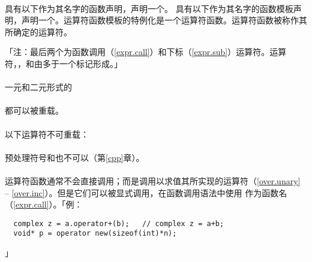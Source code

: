 \paragraph{}
具有以下作为其名字的函数声明，声明一个。
具有以下作为其名字的函数模板声明，声明一个。运算符函数模板的特例化是一个运算符函数。运算符函数被称作其
所确定的运算符。

 { %
  \newcommand{\cir}{\textasciicircum}
  \newcommand{\til}{\textasciitilde}
  \newcommand{\ttl}{\textless}
  \newcommand{\ttg}{\textgreater}
  \synprd{\tm{+ \ \ \ - \ \ \ \ \ * \ \ \ \ / \ \ \ \ \ \ \ \% \ \ \ \ \cir \ \
              \ \ \ \& \ \ \ \ | \ \ \ \ \til}}
  \synprd{\tm{! \ \ = \ \ \ \ \ < \ \ \ \ > \ \ \ \ \ \ \ += \ \ \ -= \ \ \ *= \
              \ \ /= \ \ \ \%=}}
  \synprd{\tm{\cir= \ \ \&= \ \ \ \ |= \ \ \ \ttl{}\ttl \ \ \ \ \ \ \ \ttg{}\ttg
              \ \ \ \ \ttg{}\ttg= \ \ \ttl{}\ttl= \ \ == \ \ \ !=}}
  \synprd{\tm{\ttl= \ \ \ttg= \ \ \ \ \&\& \ \ \ || \ \ \ \ \ \ ++ \ \ \ -- \ \
              \ \ , \ \ \ \ ->* \ \ ->}}
  \synprd[]{\tm{() \ \ []}}
} %

「注：最后两个为函数调用（\ref{expr.call}）和下标（\ref{expr.sub}）运算符。运算
符\tm{new[]}，，\tm{()}和\tm{[]}由多于一个标记形成。」

\paragraph{}
一元和二元形式的                                                              \\
\mbox{\qquad{\tm{+\qquad{-} \qquad{*} \qquad{\&}}}}                           \\
都可以被重载。

\paragraph{}
以下运算符不可重载：                                                          \\
\mbox{}                           \\
预处理符号\tm{\#}和\tm{\#\#}也不可以（第\ref{cpp}章）。

\paragraph{}
运算符函数通常不会直接调用；而是调用以求值其所实现的运算符（\ref{over.unary} --
\ref{over.inc}）。但是它们可以被显式调用，在函数调用语法中使用
作为函数名（\ref{expr.call}）。「例：
\begin{lstlisting}
  complex z = a.operator+(b);   // complex z = a+b;
  void* p = operator new(sizeof(int)*n);
\end{lstlisting}」

